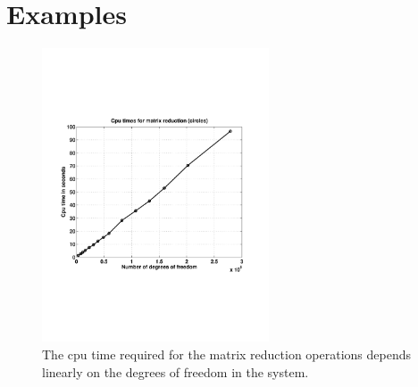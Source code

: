 \section{Examples}

\begin{figure}[tbhp]
  \vspace{-25mm}
  \centerline{\includegraphics[width=0.6\textwidth]{reduction_cpu.pdf}}
  \vspace{-25mm}
  \caption{The cpu time required for the matrix reduction operations
  depends linearly on the degrees of freedom in the system.}
\end{figure}


